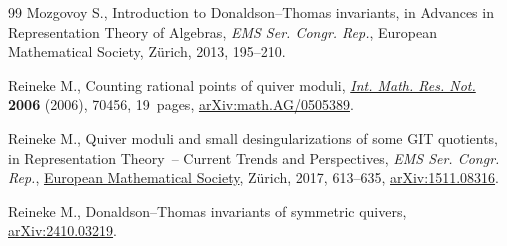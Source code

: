 \documentclass[10pt,a4paper]{amsart}
\numberwithin{equation}{section}
\theoremstyle{definition}
\begin{document}
\begin{thebibliography}{99}
Mozgovoy S., Introduction to {D}onaldson--{T}homas invariants, in Advances in
 {R}epresentation {T}heory of {A}lgebras, \textit{EMS Ser. Congr. Rep.}, European
 Mathematical Society, Z\"urich, 2013, 195--210.

Reineke M., Counting rational points of quiver moduli,
 \href{https://doi.org/10.1155/IMRN/2006/70456}{\textit{Int. Math. Res. Not.}}
 \textbf{2006} (2006), 70456, 19~pages,
 \href{http://arxiv.org/abs/math.AG/0505389}{arXiv:math.AG/0505389}.

Reineke M., Quiver moduli and small desingularizations of some {GIT} quotients,
 in Representation {T}heory~-- {C}urrent {T}rends and {P}erspectives, \textit{EMS Ser.
 Congr. Rep.}, \href{https://doi.org/10.4171/171-1/21}{European Mathematical
 Society}, Z\"urich, 2017, 613--635,
 \href{http://arxiv.org/abs/1511.08316}{arXiv:1511.08316}.

Reineke M., Donaldson--{T}homas invariants of symmetric quivers,
 \href{http://arxiv.org/abs/2410.03219}{arXiv:2410.03219}.

\end{thebibliography}
\end{document}
